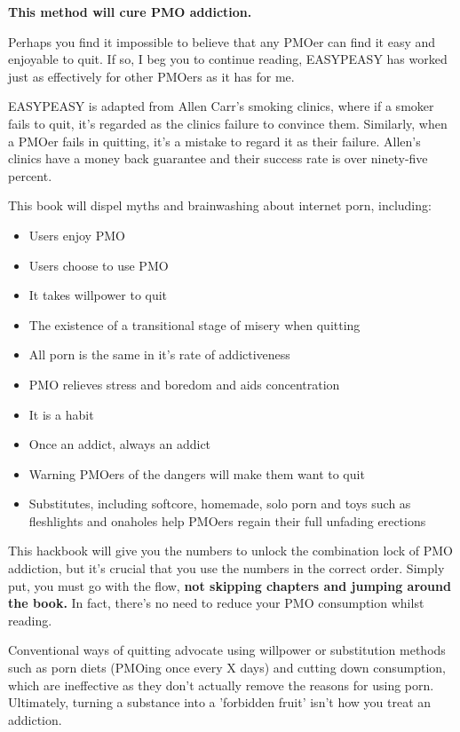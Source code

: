 \documentclass[easypeasy.tex]{subfiles}
\begin{document}
{\large\bfseries This method will cure PMO addiction.}

Perhaps you find it impossible to believe that any PMOer can find it easy and enjoyable to quit. If so, I beg you to continue reading, EASYPEASY has worked just as effectively for other PMOers as it has for me.

EASYPEASY is adapted from Allen Carr's smoking clinics, where if a smoker fails to quit, it's regarded as the clinics failure to convince them. Similarly, when a PMOer fails in quitting, it's a mistake to regard it as their failure. Allen's clinics have a money back guarantee and their success rate is over ninety-five percent.

This book will dispel myths and brainwashing about internet porn, including:
  \begin{itemize}
  \item Users enjoy PMO
  \item Users choose to use PMO
  \item It takes willpower to quit
  \item The existence of a transitional stage of misery when quitting
  \item All porn is the same in it's rate of addictiveness
  \item PMO relieves stress and boredom and aids concentration
  \item It is a habit
  \item Once an addict, always an addict
  \item Warning PMOers of the dangers will make them want to quit
  \item Substitutes, including softcore, homemade, solo porn and toys such as fleshlights and onaholes help PMOers regain their full unfading erections
\end{itemize}

This hackbook will give you the numbers to unlock the combination lock of PMO addiction, but it's crucial that you use the numbers in the correct order. Simply put, you must go with the flow, \textbf{not skipping chapters and jumping around the book.} In fact, there's no need to reduce your PMO consumption whilst reading.

Conventional ways of quitting advocate using willpower or substitution methods such as porn diets (PMOing once every X days) and cutting down consumption, which are ineffective as they don't actually remove the reasons for using porn. Ultimately, turning a substance into a 'forbidden fruit' isn't how you treat an addiction.
\end{document}
